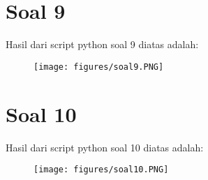 \section{Soal 9}


\par Hasil dari script python soal 9 diatas adalah: 
\begin{figure}[!htbp]
    \centering
    \texttt{[image: figures/soal9.PNG]}
    \label{soal9}
\end{figure}

\section{Soal 10}
\par Hasil dari script python soal 10 diatas adalah: 
\begin{figure}[!htbp]
    \centering
    \texttt{[image: figures/soal10.PNG]}
    \label{soal10}
\end{figure}





 

